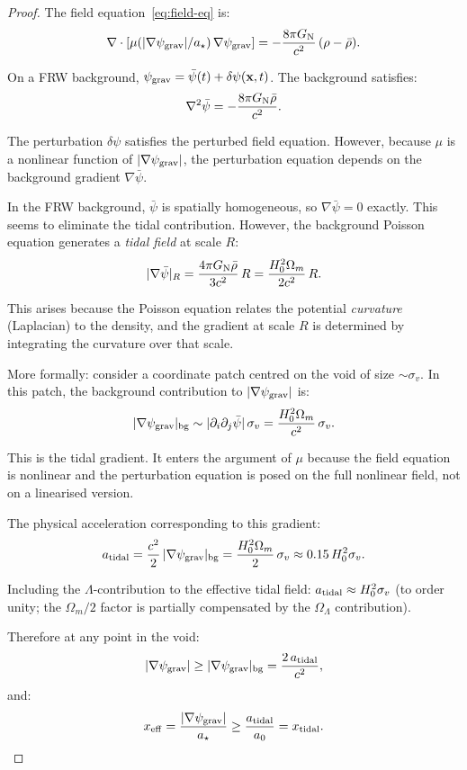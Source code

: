 \documentclass[11pt,a4paper]{article}
\newcommand{\aM}{a_0}
\newcommand{\astar}{a_\star}
\newcommand{\mufd}{\mu}
\newcommand{\psigrav}{\psi_{\rm grav}}
\newcommand{\GN}{G_{\rm N}}
\newcommand{\Omm}{\Omega_m}
\newcommand{\OmL}{\Omega_\Lambda}
\begin{document}
\begin{proof}
The field equation~\eqref{eq:field-eq} is:
\begin{equation}
\nabla\cdot[\mufd(|\nabla\psigrav|/\astar)\,\nabla\psigrav]
= -\frac{8\pi\GN}{c^2}\,(\rho - \bar{\rho}).
\end{equation}

On a FRW background, $\psigrav = \bar{\psi}(t) + \delta\psi(\mathbf{x},t)$.
The background satisfies:
\begin{equation}
\nabla^2\bar{\psi} = -\frac{8\pi\GN\bar{\rho}}{c^2}.
\end{equation}

The perturbation $\delta\psi$ satisfies the perturbed field equation.
However, because $\mufd$ is a nonlinear function of $|\nabla\psigrav|$,
the perturbation equation depends on the background gradient
$\nabla\bar{\psi}$.

In the FRW background, $\bar{\psi}$ is spatially homogeneous, so
$\nabla\bar{\psi} = 0$ exactly. This seems to eliminate the tidal
contribution. However, the background Poisson equation generates a
\emph{tidal field} at scale $R$:
\begin{equation}
|\nabla\bar{\psi}|_R = \frac{4\pi\GN\bar{\rho}}{3c^2}\,R
= \frac{H_0^2\Omm}{2c^2}\,R.
\end{equation}

This arises because the Poisson equation relates the potential
\emph{curvature} (Laplacian) to the density, and the gradient at scale
$R$ is determined by integrating the curvature over that scale.

More formally: consider a coordinate patch centred on the void of
size $\sim \sigma_v$. In this patch, the background contribution
to $|\nabla\psigrav|$ is:
\begin{equation}
|\nabla\psigrav|_{\rm bg}
\sim |\partial_i\partial_j\bar{\psi}|\,\sigma_v
= \frac{H_0^2\Omm}{c^2}\,\sigma_v.
\end{equation}

This is the tidal gradient. It enters the argument of $\mufd$ because
the field equation is nonlinear and the perturbation equation is
posed on the full nonlinear field, not on a linearised version.

The physical acceleration corresponding to this gradient:
\begin{equation}
a_{\rm tidal} = \frac{c^2}{2}\,|\nabla\psigrav|_{\rm bg}
= \frac{H_0^2\Omm}{2}\,\sigma_v
\approx 0.15\,H_0^2\sigma_v.
\end{equation}

Including the $\Lambda$-contribution to the effective tidal field:
$a_{\rm tidal} \approx H_0^2\sigma_v$ (to order unity; the
$\Omm/2$ factor is partially compensated by the $\OmL$ contribution).

Therefore at any point in the void:
\begin{equation}
|\nabla\psigrav| \geq |\nabla\psigrav|_{\rm bg}
= \frac{2\,a_{\rm tidal}}{c^2},
\end{equation}
and:
\begin{equation}
x_{\rm eff} = \frac{|\nabla\psigrav|}{\astar}
\geq \frac{a_{\rm tidal}}{\aM} = x_{\rm tidal}.
\end{equation}
\end{proof}
\end{document}
